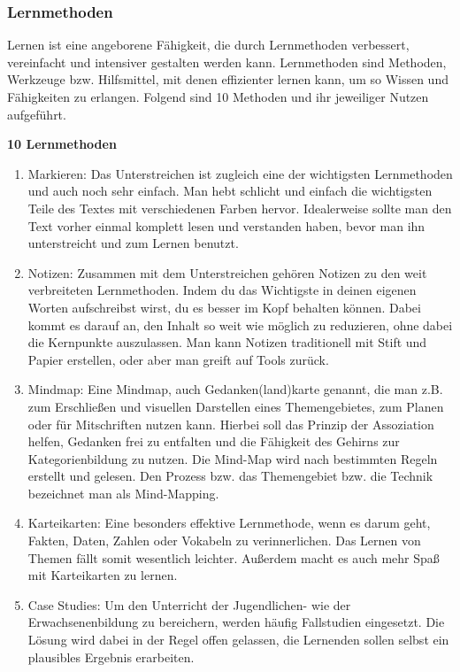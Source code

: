 \subsubsection{Lernmethoden}

Lernen ist eine angeborene Fähigkeit, die durch Lernmethoden verbessert, vereinfacht und intensiver gestalten werden kann. Lernmethoden sind Methoden, Werkzeuge bzw. Hilfsmittel, mit denen effizienter lernen kann, um so Wissen und Fähigkeiten zu erlangen. Folgend sind 10 Methoden und ihr jeweiliger Nutzen aufgeführt.

{\bf 10 Lernmethoden}\\
\begin{enumerate}
	\item Markieren: Das Unterstreichen ist zugleich eine der wichtigsten Lernmethoden und auch noch sehr einfach. Man hebt schlicht und einfach die wichtigsten Teile des Textes mit verschiedenen Farben hervor. Idealerweise sollte man den Text vorher einmal komplett lesen und verstanden haben, bevor man ihn unterstreicht und zum Lernen benutzt.
	\item Notizen: Zusammen mit dem Unterstreichen gehören Notizen zu den weit verbreiteten Lernmethoden. Indem du das Wichtigste in deinen eigenen Worten aufschreibst wirst, du es besser im Kopf behalten können. Dabei kommt es darauf an, den Inhalt so weit wie möglich zu reduzieren, ohne dabei die Kernpunkte auszulassen.  Man kann Notizen traditionell mit Stift und Papier erstellen, oder aber man greift auf Tools zurück.
	\item Mindmap: Eine Mindmap, auch Gedanken(land)karte genannt, die man z.B. zum Erschließen und visuellen Darstellen eines Themengebietes, zum Planen oder für Mitschriften nutzen kann. Hierbei soll das Prinzip der Assoziation helfen, Gedanken frei zu entfalten und die Fähigkeit des Gehirns zur Kategorienbildung zu nutzen. Die Mind-Map wird nach bestimmten Regeln erstellt und gelesen. Den Prozess bzw. das Themengebiet bzw. die Technik bezeichnet man als Mind-Mapping.
	\item Karteikarten: Eine besonders effektive Lernmethode, wenn es darum geht, Fakten, Daten, Zahlen oder Vokabeln zu verinnerlichen. Das Lernen von Themen fällt somit wesentlich leichter. Außerdem macht es auch mehr Spaß mit Karteikarten zu lernen.
	\item Case Studies: Um den Unterricht der Jugendlichen- wie der Erwachsenenbildung zu bereichern, werden häufig Fallstudien eingesetzt. 
Die Lösung wird dabei in der Regel offen gelassen, die Lernenden sollen selbst ein plausibles Ergebnis erarbeiten. 

\end{enumerate}
